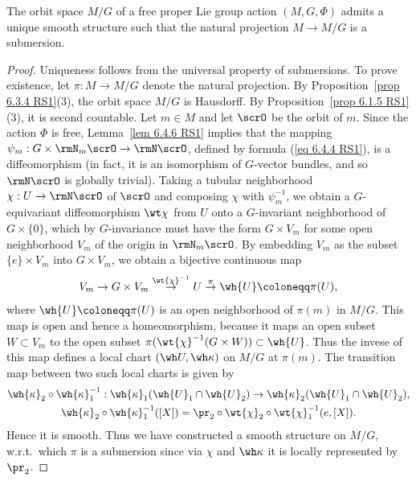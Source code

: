 \begin{cor}[{{\cite[Cor.~6.5.1]{RS1}}}]\label{cor 6.5.1 RS1}
    The orbit space $M\slash G$ of a free proper Lie group action $(M,G,\Phi)$ admits a unique smooth structure such that the natural projection $M\to M\slash G$ is a submersion.
\end{cor}
\begin{proof}
    Uniqueness follows from the universal property of submersions. To prove existence, let $\pi:M\to M\slash G$ denote the natural projection. By Proposition~\ref{prop 6.3.4 RS1}(3), the orbit space $M\slash G$ is Hausdorff. By Proposition~\ref{prop 6.1.5 RS1}(3), it is second countable. Let $m\in M$ and let $\scrO$ be the orbit of $m$. Since the action $\Phi$ is free, Lemma~\ref{lem 6.4.6 RS1} implies that the mapping $\psi_m:G\times \rmN_m \scrO\to \rmN \scrO$, defined by formula (\ref{eq 6.4.4 RS1}), is a diffeomorphism (in fact, it is an isomorphism of $G$-vector bundles, and so $\rmN \scrO$ is globally trivial). Taking a tubular neighborhood $\chi:U\to \rmN \scrO$ of $\scrO$ and composing $\chi$ with $\psi_m^{-1}$, we obtain a $G$-equivariant diffeomorphism $\wt\chi$ from $U$ onto a $G$-invariant neighborhood of $G\times\{0\}$, which by $G$-invariance must have the form $G\times V_m$ for some open neighborhood $V_m$ of the origin in $\rmN_m\scrO$. By embedding $V_m$ as the subset $\{e\}\times V_m$ into $G\times V_m$, we obtain a bijective continuous map
    \[V_m\to G\times V_m\overset{\wt{\chi}^{-1}}{\to}U\overset{\pi}{\to}\wh{U}\coloneqq \pi(U),\]
    where $\wh{U}\coloneqq \pi(U)$ is an open neighborhood of $\pi(m)$ in $M\slash G$. This map is open and hence a homeomorphism, because it maps an open subset $W\subset V_m$ to the open subset $\pi(\wt{\chi}^{-1}(G\times W))\subset \wh{U}$. Thus the invese of this map defines a local chart $(\wh U,\wh \kappa)$ on $M\slash G$ at $\pi(m)$. The transition map between two such local charts is given by
    \begin{gather}
        \wh{\kappa}_2\circ\wh{\kappa}_1^{-1}:\wh{\kappa}_1(\wh{U}_1\cap \wh{U}_2)\to \wh{\kappa}_2(\wh{U}_1\cap \wh{U}_2),\\
        \wh{\kappa}_2\circ\wh{\kappa}_1^{-1}([X])=\pr_2\circ\wt{\chi}_2\circ\wt{\chi}_1^{-1}(e,[X]).
    \end{gather}
    Hence it is smooth. Thus we have constructed a smooth structure on $M\slash G$, w.r.t.\ which $\pi$ is a submersion since via $\chi$ and $\wh\kappa$ it is locally represented by $\pr_2$.
\end{proof}

